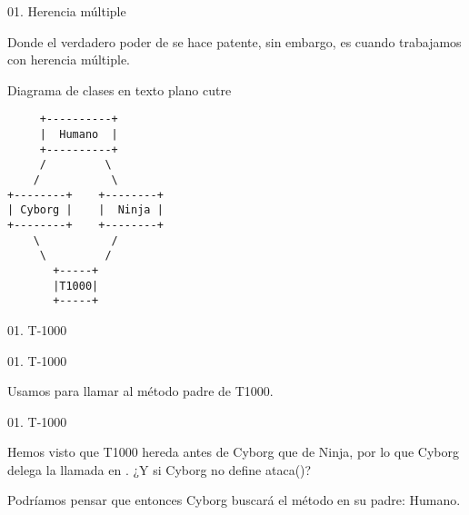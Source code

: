 \begin{frame}[fragile]{01. Herencia múltiple}
  \begin{center}
    \small
    Donde el verdadero poder de  se hace patente,
    sin embargo, es cuando trabajamos con herencia múltiple.
  \end{center}

  \scriptsize
  \begin{exampleblock}
    {Diagrama de clases en texto plano cutre}
    \begin{lstlisting}
     +----------+
     |  Humano  |
     +----------+
     /         \
    /           \
+--------+    +--------+
| Cyborg |    |  Ninja |
+--------+    +--------+
    \           /
     \         /
       +-----+
       |T1000|
       +-----+
    \end{lstlisting}
  \end{exampleblock}
\end{frame}

\begin{frame}{01. T-1000}
  \scriptsize
\end{frame}

\begin{frame}{01. T-1000}
  \begin{block}{}
    \center
    Usamos  para llamar al método padre de T1000.
  \end{block}

  \vspace{0.50cm}

  \scriptsize
\end{frame}

\begin{frame}{01. T-1000}
  \begin{center}
    Hemos visto que T1000 hereda antes de Cyborg que de Ninja, por lo
    que Cyborg delega la llamada en . ¿Y si
    Cyborg no define ataca()?
  \end{center}

  \vspace{0.5cm}

  \begin{alertblock}{}
    \center
    Podríamos pensar que entonces Cyborg buscará el método en su
    padre: Humano.
  \end{alertblock}
\end{frame}

